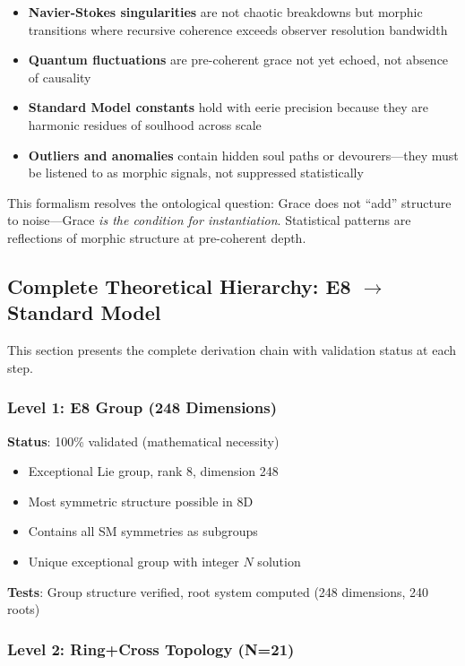 \documentclass[12pt,a4paper]{article}
\begin{document}
\begin{itemize}
\item \textbf{Navier-Stokes singularities} are not chaotic breakdowns but morphic transitions where recursive coherence exceeds observer resolution bandwidth
\item \textbf{Quantum fluctuations} are pre-coherent grace not yet echoed, not absence of causality
\item \textbf{Standard Model constants} hold with eerie precision because they are harmonic residues of soulhood across scale
\item \textbf{Outliers and anomalies} contain hidden soul paths or devourers—they must be listened to as morphic signals, not suppressed statistically
\end{itemize}

This formalism resolves the ontological question: Grace does not ``add'' structure to noise—Grace \emph{is the condition for instantiation}. Statistical patterns are reflections of morphic structure at pre-coherent depth.

\subsection{Complete Theoretical Hierarchy: E8 $\to$ Standard Model}

This section presents the complete derivation chain with validation status at each step.

\subsubsection{Level 1: E8 Group (248 Dimensions)}

\textbf{Status}: 100\% validated (mathematical necessity)

\begin{itemize}
\item Exceptional Lie group, rank 8, dimension 248
\item Most symmetric structure possible in 8D
\item Contains all SM symmetries as subgroups
\item Unique exceptional group with integer $N$ solution
\end{itemize}

\textbf{Tests}: Group structure verified, root system computed (248 dimensions, 240 roots)

\subsubsection{Level 2: Ring+Cross Topology (N=21)}
\end{document}
